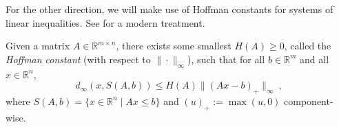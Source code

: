 \documentclass[twoside,11pt]{article}
\newcommand{\reals}{\mathbb{R}}
\begin{document}
For the other direction, we will make use of Hoffman constants for systems of linear inequalities.
See \citet{zalinescu2003sharp} for a modern treatment.
\begin{theorem}
  \label{thm:hoffman}
  Given a matrix $A\in\reals^{m\times n}$, there exists some smallest $H(A)\geq 0$, called the \emph{Hoffman constant} (with respect to $\|\cdot\|_\infty$), such that for all $b\in\reals^m$ and all $x\in\reals^n$,
  \begin{equation}
    \label{eq:hoffman}
    d_\infty(x,S(A,b)) \leq H(A) \|(A x - b)_+\|_\infty~,
  \end{equation}
  where $S(A,b) = \{x\in\reals^n \mid A x \leq b\}$ and $(u)_+ := \max(u,0)$ component-wise.
\end{theorem}
\end{document}
